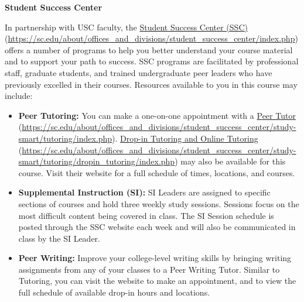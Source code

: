 \documentclass[11pt,letterpaper]{article}
\begin{document}
{\bfseries Student Success Center} \par
In partnership with USC faculty, the \href{https://sc.edu/about/offices\_and\_divisions/student\_success\_center/index.php}{Student Success Center (SSC)} (\url{https://sc.edu/about/offices\_and\_divisions/student\_success\_center/index.php}) offers a number of programs to help you better understand your course material and to support your path to success. SSC programs are facilitated by professional staff, graduate students, and trained undergraduate peer leaders who have previously excelled in their courses. Resources available to you in this course may include:
	\begin{itemize}
	\item {\bfseries Peer Tutoring:} You can make a one-on-one appointment with a \href{https://sc.edu/about/offices\_and\_divisions/student\_success\_center/study-smart/tutoring/index.php}{Peer Tutor} (\url{https://sc.edu/about/offices\_and\_divisions/student\_success\_center/study-smart/tutoring/index.php}). 
	\href{https://sc.edu/about/offices\_and\_divisions/student\_success\_center/study-smart/tutoring/dropin\_tutoring/index.php}{Drop-in Tutoring and Online Tutoring} (\url{https://sc.edu/about/offices\_and\_divisions/student\_success\_center/study-smart/tutoring/dropin\_tutoring/index.php}) may also be available for this course. Visit their website for a full schedule of times, locations, and courses.
	
	\item {\bfseries Supplemental Instruction (SI):} SI Leaders are assigned to specific sections of courses and hold three weekly study sessions. Sessions focus on the most difficult content being covered in class. The SI Session schedule is posted through the SSC website each week and will also be communicated in class by the SI Leader.
	




\newpage





	\item {\bfseries Peer Writing:} Improve your college-level writing skills by bringing writing assignments from any of your classes to a Peer Writing Tutor. Similar to Tutoring, you can visit the website to make an appointment, and to view the full schedule of available drop-in hours and locations.
	

\end{itemize}
\end{document}
